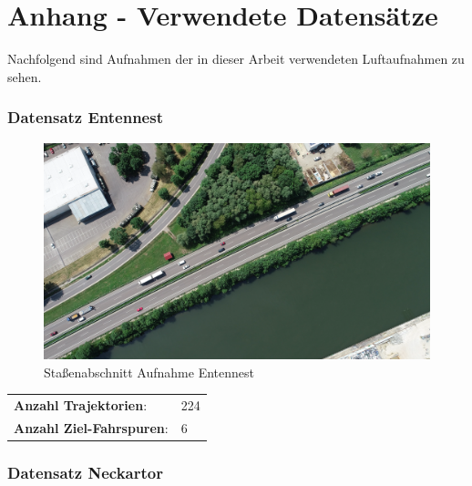 
\chapter{Anhang - Verwendete Datensätze}
\label{cha:anhang_a}

Nachfolgend sind Aufnahmen der in dieser Arbeit verwendeten Luftaufnahmen zu sehen.

\subsection*{Datensatz Entennest}

\begin{minipage}{0.55\textwidth}
    \begin{figure}[H]
        \includegraphics[width=\linewidth]{resources/img/Anhang/Entennest}
    \caption[]{Staßenabschnitt Aufnahme Entennest}
    \label{fig:anhang_ds_entennest}
    \end{figure}
\end{minipage} \hfill
\begin{minipage}{0.35\textwidth}
    \begin{tabular}{ll}
    \textbf{Anzahl Trajektorien}: &  224 \\
    \textbf{Anzahl Ziel-Fahrspuren}: & 6 \\
    \end{tabular}
\end{minipage}

\subsection*{Datensatz Neckartor}

